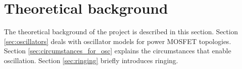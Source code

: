 \section{Theoretical background}
\label{sec:theory}

The theoretical background of the project is described in this section. Section \ref{sec:oscillators} deals with oscillator models for power MOSFET topologies. Section \ref{sec:circumstances_for_osc} explains the circumstances that enable oscillation. Section \ref{sec:ringing} briefly introduces ringing.




